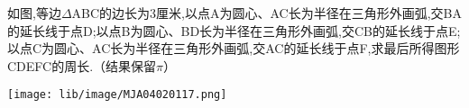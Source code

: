 如图,等边$\Delta$ABC的边长为3厘米,以点A为圆心、AC长为半径在三角形外画弧,交BA的延长线于点D;以点B为圆心、BD长为半径在三角形外画弧,交CB的延长线于点E;以点C为圆心、AC长为半径在三角形外画弧,交AC的延长线于点F,求最后所得图形CDEFC的周长.（结果保留$\pi$）

\begin{flushright}

    \texttt{[image: lib/image/MJA04020117.png]}

\end{flushright}



